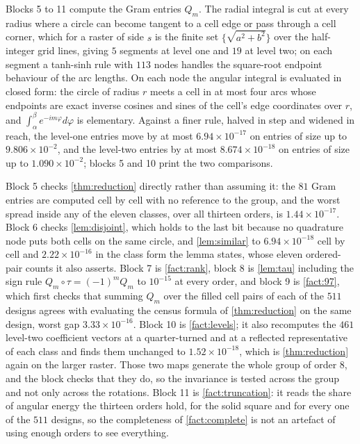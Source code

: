 \documentclass[11pt]{amsart}
\theoremstyle{definition}
\theoremstyle{remark}
\begin{document}
Blocks 5 to 11 compute the Gram entries $Q_m$. The radial integral is cut at every radius where a circle can become tangent to a cell edge or pass through a cell corner, which for a raster of side $s$ is the finite set $\{\sqrt{a^2+b^2}\}$ over the half-integer grid lines, giving $5$ segments at level one and $19$ at level two; on each segment a tanh-sinh rule with $113$ nodes handles the square-root endpoint behaviour of the arc lengths. On each node the angular integral is evaluated in closed form: the circle of radius $r$ meets a cell in at most four arcs whose endpoints are exact inverse cosines and sines of the cell's edge coordinates over $r$, and $\int_\alpha^\beta e^{-im\varphi} d\varphi$ is elementary. Against a finer rule, halved in step and widened in reach, the level-one entries move by at most $6.94 \times 10^{-17}$ on entries of size up to $9.806\times 10^{-2}$, and the level-two entries by at most $8.674 \times 10^{-18}$ on entries of size up to $1.090 \times 10^{-2}$; blocks 5 and 10 print the two comparisons.

Block 5 checks \cref{thm:reduction} directly rather than assuming it: the $81$ Gram entries are computed cell by cell with no reference to the group, and the worst spread inside any of the eleven classes, over all thirteen orders, is $1.44\times10^{-17}$. Block 6 checks \cref{lem:disjoint}, which holds to the last bit because no quadrature node puts both cells on the same circle, and \cref{lem:similar} to $6.94\times10^{-18}$ cell by cell and $2.22\times10^{-16}$ in the class form the lemma states, whose eleven ordered-pair counts it also asserts. Block 7 is \cref{fact:rank}, block 8 is \cref{lem:tau} including the sign rule $Q_m \circ \tau = (-1)^m Q_m$ to $10^{-15}$ at every order, and block 9 is \cref{fact:97}, which first checks that summing $Q_m$ over the filled cell pairs of each of the $511$ designs agrees with evaluating the census formula of \cref{thm:reduction} on the same design, worst gap $3.33\times10^{-16}$. Block 10 is \cref{fact:levels}; it also recomputes the $461$ level-two coefficient vectors at a quarter-turned and at a reflected representative of each class and finds them unchanged to $1.52\times10^{-18}$, which is \cref{thm:reduction} again on the larger raster. Those two maps generate the whole group of order $8$, and the block checks that they do, so the invariance is tested across the group and not only across the rotations. Block 11 is \cref{fact:truncation}: it reads the share of angular energy the thirteen orders hold, for the solid square and for every one of the $511$ designs, so the completeness of \cref{fact:complete} is not an artefact of using enough orders to see everything.
\end{document}
